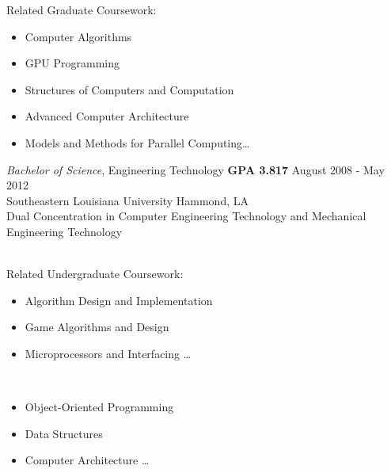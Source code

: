 \documentclass{res}
\begin{document}
\begin{resume}
\begin{multicols}{2}
{		Related Graduate Coursework:  \vspace{-0.175in}
		\begin{itemize}
			\item Computer Algorithms
			\item GPU Programming
			\item Structures of Computers and Computation
			\item Advanced Computer Architecture
			\item Models and Methods for Parallel Computing\ldots
			\end{itemize}
	}
	\end{multicols}

	{\sl Bachelor of Science}, Engineering Technology {\bf GPA 3.817} \hfill August 2008 - May 2012\\
	Southeastern Louisiana University \hfill Hammond, LA\\
	{\footnotesize Dual Concentration in Computer Engineering Technology and Mechanical Engineering Technology}\\\\
		\vspace{-0.49in}
		\begin{multicols}{2}
			{\footnotesize 
				Related Undergraduate Coursework: \vspace{-0.175in}
				\begin{itemize}
					\item Algorithm Design and Implementation
					\item Game Algorithms and Design
					\item Microprocessors and Interfacing \ldots
				\end{itemize} 
				\ %
				\vspace{-0.175in}
				\begin{itemize}
					\item Object-Oriented Programming
					\item Data Structures
					\item Computer Architecture \ldots
				\end{itemize}
			}
		\end{multicols}
		
	

\end{resume}
\end{document}
